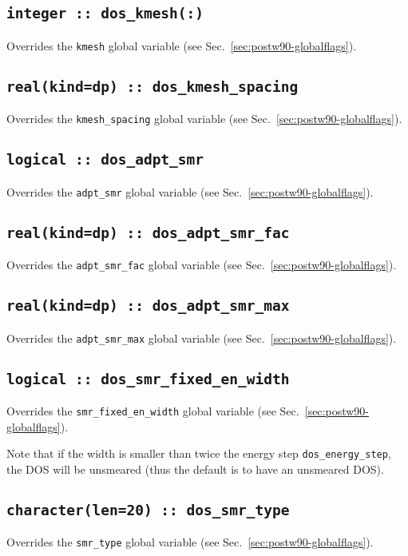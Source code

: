 \subsection[dos\_kmesh]{\tt integer :: dos\_kmesh(:)}
Overrides the \verb#kmesh# global variable (see Sec.~\ref{sec:postw90-globalflags}).

\subsection[dos\_kmesh\_spacing]{\tt real(kind=dp) :: dos\_kmesh\_spacing}
Overrides the \verb#kmesh_spacing# global variable (see Sec.~\ref{sec:postw90-globalflags}).

\subsection[dos\_adpt\_smr]{\tt logical :: dos\_adpt\_smr}
Overrides the \verb#adpt_smr# global variable (see Sec.~\ref{sec:postw90-globalflags}).

\subsection[dos\_adpt\_smr\_fac]{\tt real(kind=dp) :: dos\_adpt\_smr\_fac}
Overrides the \verb#adpt_smr_fac# global variable (see
Sec.~\ref{sec:postw90-globalflags}).

\subsection[dos\_adpt\_smr\_max]{\tt real(kind=dp) ::
  dos\_adpt\_smr\_max}
Overrides the \verb#adpt_smr_max# global variable (see
Sec.~\ref{sec:postw90-globalflags}).

\subsection[dos\_smr\_fixed\_en\_width]{\tt logical :: dos\_smr\_fixed\_en\_width}
Overrides the \verb#smr_fixed_en_width# global variable (see
Sec.~\ref{sec:postw90-globalflags}).

Note that if the width is smaller than twice the energy step {\tt dos\_energy\_step}, the DOS
will be unsmeared (thus the default is to have an unsmeared DOS).


\subsection[dos\_smr\_type]{\tt  character(len=20) :: dos\_smr\_type}
Overrides the \verb#smr_type# global variable (see Sec.~\ref{sec:postw90-globalflags}).


